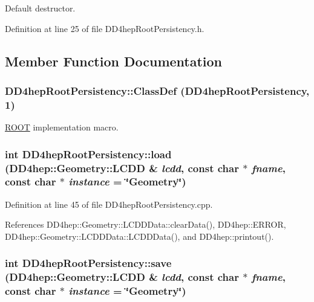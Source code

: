 Default destructor. 

Definition at line 25 of file DD4hepRootPersistency.h.

\subsection{Member Function Documentation}
\hypertarget{class_d_d4hep_root_persistency_af47b83fcc3468d2e8fca243d2cac8758}{
\subsubsection[{ClassDef}]{\setlength{\rightskip}{0pt plus 5cm}DD4hepRootPersistency::ClassDef ({\bf DD4hepRootPersistency}, \/  1)}}
\label{class_d_d4hep_root_persistency_af47b83fcc3468d2e8fca243d2cac8758}


\hyperlink{namespace_r_o_o_t}{ROOT} implementation macro. \hypertarget{class_d_d4hep_root_persistency_a01f849c58fac51a46b47bcaf18fb87cf}{
\subsubsection[{load}]{\setlength{\rightskip}{0pt plus 5cm}int DD4hepRootPersistency::load ({\bf DD4hep::Geometry::LCDD} \& {\em lcdd}, \/  const char $\ast$ {\em fname}, \/  const char $\ast$ {\em instance} = {\ttfamily \char`\"{}Geometry\char`\"{}})}}
\label{class_d_d4hep_root_persistency_a01f849c58fac51a46b47bcaf18fb87cf}


Definition at line 45 of file DD4hepRootPersistency.cpp.

References DD4hep::Geometry::LCDDData::clearData(), DD4hep::ERROR, DD4hep::Geometry::LCDDData::LCDDData(), and DD4hep::printout().\hypertarget{class_d_d4hep_root_persistency_a29e9e5f5a15dd597278c5960d25c69f3}{
\subsubsection[{save}]{\setlength{\rightskip}{0pt plus 5cm}int DD4hepRootPersistency::save ({\bf DD4hep::Geometry::LCDD} \& {\em lcdd}, \/  const char $\ast$ {\em fname}, \/  const char $\ast$ {\em instance} = {\ttfamily \char`\"{}Geometry\char`\"{}})}}
\label{class_d_d4hep_root_persistency_a29e9e5f5a15dd597278c5960d25c69f3}


